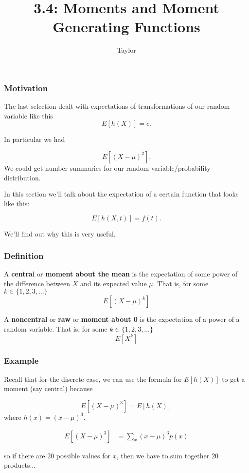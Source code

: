\documentclass{beamer}
\title["3.4"]{3.4: Moments and Moment Generating Functions}
\author{Taylor}
\institute[UVA] 
{
University of Virginia \\
\medskip
\textit{} 
}
\date{}
\begin{document}

\begin{frame}
\titlepage 
\end{frame}

\begin{frame}
\frametitle{Motivation}

The last selection dealt with expectations of transformations of our random variable like this
\[
E[h(X)] = c.
\]

In particular we had

\[
E[(X- \mu)^2] .
\]
We could get number summaries for our random variable/probability distribution. 
\newline

In this section we'll talk about the expectation of a certain function that looks like this:

\[
E[h(X,t)] = f(t).
\]

We'll find out why this is very useful.

\end{frame}


\begin{frame}
\frametitle{Definition}

A \textbf{central} or \textbf{moment about the mean} is the expectation of some power of the difference between $X$ and its expected value $\mu$. That is, for some $k \in \{1,2,3,\ldots\}$
\[
E[(X-\mu)^k]
\]

A \textbf{noncentral} or \textbf{raw} or \textbf{moment about 0} is the expectation of a power of a random variable. That is, for some $k \in \{1,2,3,\ldots\}$
\[
E[X^k]
\]


\end{frame}



\begin{frame}
\frametitle{Example}

Recall that for the discrete case, we can use the formula for $E[h(X)]$ to get a moment (say central) because

\[
E[(X-\mu)^3] = E[h(X)]
\]
where $h(x) = (x-\mu)^3$. 

\begin{align*}
E[(X-\mu)^3] &= \sum_{x} (x-\mu)^3 p(x)
\end{align*}

so if there are $20$ possible values for $x$, then we have to sum together $20$ products...

\end{frame}
\end{document}
